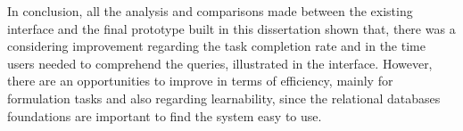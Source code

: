 In conclusion, all the analysis and comparisons made between the existing interface and the final prototype built in this dissertation shown that, there was a considering improvement regarding the task completion rate and in the time users needed to comprehend the queries, illustrated in the interface. However, there are an opportunities to improve in terms of efficiency, mainly for formulation tasks and also regarding learnability, since the relational databases foundations are important to find the system easy to use.

